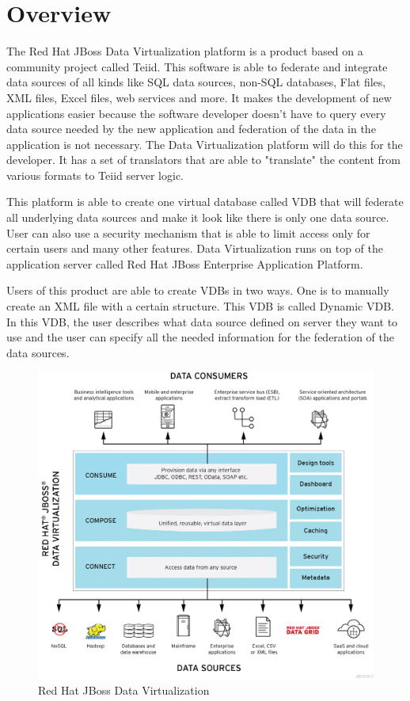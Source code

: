 \documentclass[12pt,oneside]{fithesis2}
\begin{document}
\section{Overview}
\par The Red Hat JBoss Data Virtualization platform is a product based on a community project called Teiid.  This software is able to federate and integrate data sources of all kinds like SQL data sources, non-SQL databases, Flat files, XML files, Excel files, web services and more. It makes the development of new applications easier because the software developer doesn't have to query every data source needed by the new application and federation of the data in the application is not necessary. The Data Virtualization platform will do this for the developer. It has a set of translators that are able to "translate" the content from various formats to Teiid server logic.
\par This platform is able to create one virtual database called VDB that will federate all underlying data sources and make it look like there is only one data source. User can also use a security mechanism that is able to limit  access only for certain users and many other features. Data Virtualization runs on top of the application server called Red Hat JBoss Enterprise Application Platform.
\par Users of this product are able to create VDBs in two ways. One is to manually create an XML file with a certain structure. This VDB is called Dynamic VDB. In this VDB, the user describes what data source defined on server they want to use and the user can specify all the needed information for the federation of the data sources.
\begin{figure}[H]
\caption{Red Hat JBoss Data Virtualization}
\label{fig:dv}
\centering
\vspace{5mm}
\includegraphics[scale=0.15]{dv} 
\end{figure} 
\end{document}
